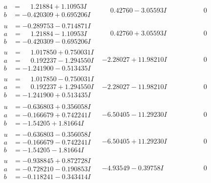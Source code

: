 \documentclass[1p]{elsarticle_modified}
\theoremstyle{definition}
\begin{document}
$$\begin{array}{c|c|c}
\begin{aligned}
a &= \phantom{-}1.21884 + 1.10953 I \\
b &= -0.420309 + 0.695206 I\end{aligned}
 & \phantom{-}0.42760 - 3.05593 I & \phantom{-0.000000 } 0 \\ \hline\begin{aligned}
u &= -0.289753 - 0.714871 I \\
a &= \phantom{-}1.21884 - 1.10953 I \\
b &= -0.420309 - 0.695206 I\end{aligned}
 & \phantom{-}0.42760 + 3.05593 I & \phantom{-0.000000 } 0 \\ \hline\begin{aligned}
u &= \phantom{-}1.017850 + 0.750031 I \\
a &= \phantom{-}0.192237 - 1.294550 I \\
b &= -1.241900 - 0.513435 I\end{aligned}
 & -2.28027 + 11.98210 I & \phantom{-0.000000 } 0 \\ \hline\begin{aligned}
u &= \phantom{-}1.017850 - 0.750031 I \\
a &= \phantom{-}0.192237 + 1.294550 I \\
b &= -1.241900 + 0.513435 I\end{aligned}
 & -2.28027 - 11.98210 I & \phantom{-0.000000 } 0 \\ \hline\begin{aligned}
u &= -0.636803 + 0.356058 I \\
a &= -0.166679 + 0.742241 I \\
b &= -1.54205 + 1.81664 I\end{aligned}
 & -6.50405 - 11.29230 I & \phantom{-0.000000 } 0 \\ \hline\begin{aligned}
u &= -0.636803 - 0.356058 I \\
a &= -0.166679 - 0.742241 I \\
b &= -1.54205 - 1.81664 I\end{aligned}
 & -6.50405 + 11.29230 I & \phantom{-0.000000 } 0 \\ \hline\begin{aligned}
u &= -0.938845 + 0.872728 I \\
a &= -0.728210 - 0.190853 I \\
b &= -0.118241 - 0.343414 I\end{aligned}
 & -4.93549 - 0.39758 I & \phantom{-0.000000 } 0 \\ \hline\begin{aligned}

\end{aligned}
\end{array}$$
\end{document}
